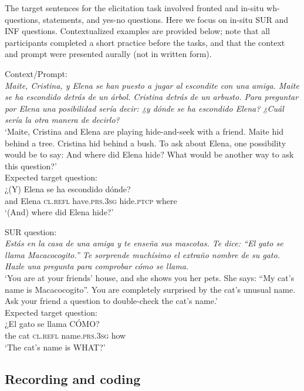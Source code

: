 \documentclass[output=paper,colorlinks,citecolor=brown,draftmode]{langscibook}
\begin{document}
The target sentences for the elicitation task involved fronted and in-situ wh-questions, statements, and yes-no questions. Here we focus on in-situ SUR and INF questions. Contextualized examples are provided below; note that all participants completed a short practice before the tasks, and that the context and prompt were presented aurally (not in written form).

\ea %
\ea Context/Prompt: \\
\textit{Maite, Cristina, y Elena se han puesto a jugar al escondite con una amiga. Maite se ha escondido detrás de un árbol. Cristina detrás de un arbusto. Para preguntar por Elena una posibilidad sería decir: ¿y dónde se ha escondido Elena? ¿Cuál sería la otra manera de decirlo?}\\
‘Maite, Cristina and Elena are playing hide-and-seek with a friend. Maite hid behind a tree. Cristina hid behind a bush. To ask about Elena, one possibility would be to say: And where did Elena hide? What would be another way to ask this question?’\\
\ex
Expected target question:\\
\gll ¿(Y) Elena se ha escondido dónde?\\
and Elena \textsc{cl}.\textsc{refl} have.\textsc{prs}.3\textsc{sg} hide.\textsc{ptcp}  where \\
\glt ‘(And) where did Elena hide?’\\
\z
\z

\ea %
\ea SUR question: \\
\textit{Estás en la casa de una amiga y te enseña sus mascotas. Te dice: “El gato se llama Macacocogito.” Te sorprende muchísimo el extraño nombre de su gato. Hazle una pregunta para comprobar cómo se llama.}\\
‘You are at your friends’ house, and she shows you her pets. She says: “My cat’s name is Macacocogito”. You are completely surprised by the cat’s unusual name. Ask your friend a question to double-check the cat’s name.’\\
\ex
Expected target question:\\
\gll ¿El gato se        llama               C\'OMO?\\
the cat \textsc{cl}.\textsc{refl}  name.\textsc{prs}.3\textsc{sg} how \\
\glt ‘The cat’s name is WHAT?’\\
\z
\z

\subsection{Recording and coding}
\end{document}
